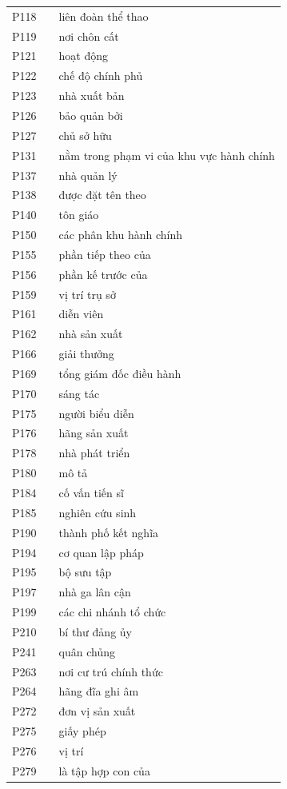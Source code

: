 \begin{center}
\begin{longtable}{p{1.6cm} p{5.2cm} p{5.2cm}}
P118 &  & liên đoàn thể thao \\
P119 &  & nơi chôn cất \\
P121 &  & hoạt động \\
P122 &  & chế độ chính phủ \\
P123 &  & nhà xuất bản \\
P126 &  & bảo quản bởi \\
P127 &  & chủ sở hữu \\
P131 &  & nằm trong phạm vi của khu vực hành chính \\
P137 &  & nhà quản lý \\
P138 &  & được đặt tên theo \\
P140 &  & tôn giáo \\
P150 &  & các phân khu hành chính \\
P155 &  & phần tiếp theo của \\
P156 &  & phần kế trước của \\
P159 &  & vị trí trụ sở \\
P161 &  & diễn viên \\
P162 &  & nhà sản xuất \\
P166 &  & giải thưởng \\
P169 &  & tổng giám đốc điều hành \\
P170 &  & sáng tác \\
P175 &  & người biểu diễn \\
P176 &  & hãng sản xuất \\
P178 &  & nhà phát triển \\
P180 &  & mô tả \\
P184 &  & cố vấn tiến sĩ \\
P185 &  & nghiên cứu sinh \\
P190 &  & thành phố kết nghĩa \\
P194 &  & cơ quan lập pháp \\
P195 &  & bộ sưu tập \\
P197 &  & nhà ga lân cận \\
P199 &  & các chi nhánh tổ chức \\
P210 &  & bí thư đảng ủy \\
P241 &  & quân chủng \\
P263 &  & nơi cư trú chính thức \\
P264 &  & hãng đĩa ghi âm \\
P272 &  & đơn vị sản xuất \\
P275 &  & giấy phép \\
P276 &  & vị trí \\
P279 &  & là tập hợp con của \\

\end{longtable}
\end{center}
